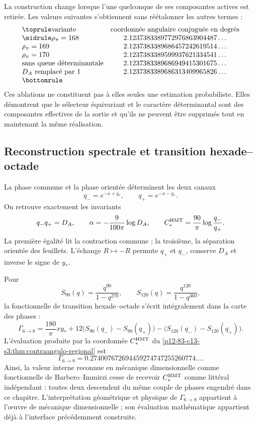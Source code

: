 La construction change lorsque l'une quelconque de ses composantes actives est retirée.
Les valeurs suivantes s'obtiennent sans réétalonner les autres termes :
\[
\begin{array}{@{}lc@{}}
\toprule
\text{variante}&\text{coordonnée angulaire conjuguée en degrés}\\
\midrule
\rho_\pi=168&2.1237383389772976863904487\ldots\\
\rho_\pi=169&2.1237383389686457242619514\ldots\\
\rho_\pi=170&2.1237383389599937621334541\ldots\\
\text{sans queue déterminantale}&2.1237383389686949415301675\ldots\\
D_A\text{ remplacé par }1&2.1237383389686313409965826\ldots\\
\bottomrule
\end{array}
\]
Ces ablations ne constituent pas à elles seules une estimation probabiliste.
Elles démontrent que le sélecteur équivariant et le caractère déterminantal sont
des composantes effectives de la sortie et qu'ils ne peuvent être supprimés tout en maintenant la
même réalisation.

\subsection{Reconstruction spectrale et transition hexade--octade}

La phase commune et la phase orientée déterminent les deux canaux
\[
q_-=e^{-x+y_*},
\qquad
q_+=e^{-x-y_*}.
\]
On retrouve exactement les invariants
\[
q_-q_+=D_A,
\qquad
\alpha=-\frac9{100\pi}\log D_A,
\qquad
C_*^{\rm HMT}=\frac{90}{\pi}\log\frac{q_-}{q_+}.
\]
La première égalité lit la contraction commune ; la troisième, la séparation
orientée des feuillets. L'échange \(R\mapsto-R\) permute
\(q_+\) et \(q_-\), conserve \(D_A\) et inverse le signe de \(y_*\).

Pour
\[
S_{90}(q)=\frac{q^{90}}{1-q^{270}},
\qquad
S_{120}(q)=\frac{q^{120}}{1-q^{360}},
\]
la fonctionnelle de transition hexade--octade s'écrit intégralement dans la
carte des phases :
\[
\Gamma_{6\to8}
=\frac{180}{\pi}xy_*
+12\bigl(S_{90}(q_-)-S_{90}(q_+)\bigr)
-\bigl(S_{120}(q_-)-S_{120}(q_+)\bigr).
\]
L'évaluation produite par la coordonnée \(C_*^{\rm HMT}\) du
\cref{p12-83-c13-s3:thm:contraangulo-regional} est
\[
\boxed{
\Gamma_{6\to8}
=0.274007672694459274747255260774\ldots.}
\]
Ainsi, la valeur interne reconnue en mécanique dimensionnelle comme fonctionnelle de
Barbero--Immirzi cesse de recevoir \(C_*^{\rm HMT}\) comme littéral indépendant :
toutes deux descendent du même couple de phases engendré dans ce chapitre.
L'interprétation géométrique et physique de \(\Gamma_{6\to8}\) appartient à l'œuvre
de mécanique dimensionnelle ; son évaluation mathématique appartient déjà à l'interface
précédemment construite.

